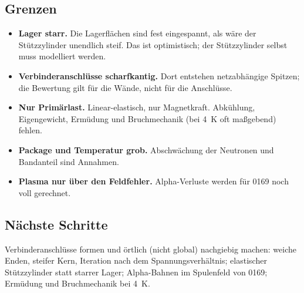 \subsection*{Grenzen}
\begin{itemize}\itemsep1pt
\item \textbf{Lager starr.} Die Lagerflächen sind fest eingespannt, als wäre der Stützzylinder unendlich steif. Das
  ist optimistisch; der Stützzylinder selbst muss modelliert werden.
\item \textbf{Verbinderanschlüsse scharfkantig.} Dort entstehen netzabhängige Spitzen; die Bewertung gilt für die
  Wände, nicht für die Anschlüsse.
\item \textbf{Nur Primärlast.} Linear-elastisch, nur Magnetkraft. Abkühlung, Eigengewicht, Ermüdung und Bruchmechanik
  (bei \SI{4}{K} oft maßgebend) fehlen.
\item \textbf{Package und Temperatur grob.} Abschwächung der Neutronen und Bandanteil sind Annahmen.
\item \textbf{Plasma nur über den Feldfehler.} Alpha-Verluste werden für 0169 noch voll gerechnet.
\end{itemize}

\subsection*{Nächste Schritte}
Verbinderanschlüsse formen und örtlich (nicht global) nachgiebig machen: weiche Enden, steifer Kern, Iteration nach
dem Spannungsverhältnis; elastischer Stützzylinder statt starrer Lager; Alpha-Bahnen im Spulenfeld von 0169;
Ermüdung und Bruchmechanik bei \SI{4}{K}.
